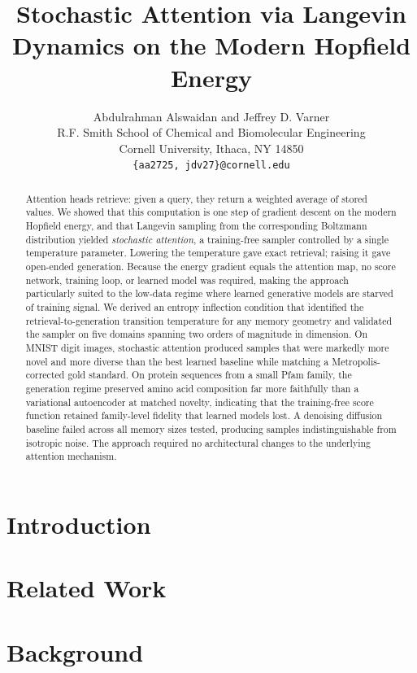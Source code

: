 \documentclass{article}
\title{Stochastic Attention via Langevin Dynamics on the Modern Hopfield Energy}
\author{%
  Abdulrahman Alswaidan and Jeffrey D. Varner \\
  R.F. Smith School of Chemical and Biomolecular Engineering\\
  Cornell University, Ithaca, NY 14850 \\
  \texttt{\{aa2725, jdv27\}@cornell.edu} \\
}
\theoremstyle{definition}
\theoremstyle{remark}
\begin{document}
\maketitle

\begin{abstract}
Attention heads retrieve: given a query, they return a weighted average of stored values. We showed that this computation is one step of gradient descent on the modern Hopfield energy, and that Langevin sampling from the corresponding Boltzmann distribution yielded \emph{stochastic attention}, a training-free sampler controlled by a single temperature parameter. Lowering the temperature gave exact retrieval; raising it gave open-ended generation. Because the energy gradient equals the attention map, no score network, training loop, or learned model was required, making the approach particularly suited to the low-data regime where learned generative models are starved of training signal. We derived an entropy inflection condition that identified the retrieval-to-generation transition temperature for any memory geometry and validated the sampler on five domains spanning two orders of magnitude in dimension. On MNIST digit images, stochastic attention produced samples that were markedly more novel and more diverse than the best learned baseline while matching a Metropolis-corrected gold standard. On protein sequences from a small Pfam family, the generation regime preserved amino acid composition far more faithfully than a variational autoencoder at matched novelty, indicating that the training-free score function retained family-level fidelity that learned models lost. A denoising diffusion baseline failed across all memory sizes tested, producing samples indistinguishable from isotropic noise. The approach required no architectural changes to the underlying attention mechanism.
\end{abstract}


\section{Introduction}


\section{Related Work}


\section{Background}

\end{document}
